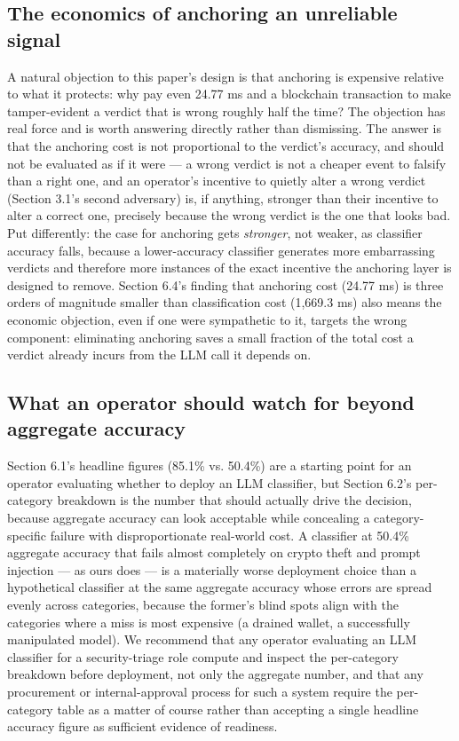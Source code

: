 \documentclass[journal,10pt,twocolumn]{IEEEtran}
\begin{document}
\subsection{The economics of anchoring an unreliable signal}

A natural objection to this paper's design is that anchoring is expensive relative to what it protects: why pay even 24.77 ms and a blockchain transaction to make tamper-evident a verdict that is wrong roughly half the time? The objection has real force and is worth answering directly rather than dismissing. The answer is that the anchoring cost is not proportional to the verdict's accuracy, and should not be evaluated as if it were --- a wrong verdict is not a cheaper event to falsify than a right one, and an operator's incentive to quietly alter a wrong verdict (Section 3.1's second adversary) is, if anything, stronger than their incentive to alter a correct one, precisely because the wrong verdict is the one that looks bad. Put differently: the case for anchoring gets \emph{stronger}, not weaker, as classifier accuracy falls, because a lower-accuracy classifier generates more embarrassing verdicts and therefore more instances of the exact incentive the anchoring layer is designed to remove. Section 6.4's finding that anchoring cost (24.77 ms) is three orders of magnitude smaller than classification cost (1,669.3 ms) also means the economic objection, even if one were sympathetic to it, targets the wrong component: eliminating anchoring saves a small fraction of the total cost a verdict already incurs from the LLM call it depends on.

\subsection{What an operator should watch for beyond aggregate accuracy}

Section 6.1's headline figures (85.1\% vs. 50.4\%) are a starting point for an operator evaluating whether to deploy an LLM classifier, but Section 6.2's per-category breakdown is the number that should actually drive the decision, because aggregate accuracy can look acceptable while concealing a category-specific failure with disproportionate real-world cost. A classifier at 50.4\% aggregate accuracy that fails almost completely on crypto theft and prompt injection --- as ours does --- is a materially worse deployment choice than a hypothetical classifier at the same aggregate accuracy whose errors are spread evenly across categories, because the former's blind spots align with the categories where a miss is most expensive (a drained wallet, a successfully manipulated model). We recommend that any operator evaluating an LLM classifier for a security-triage role compute and inspect the per-category breakdown before deployment, not only the aggregate number, and that any procurement or internal-approval process for such a system require the per-category table as a matter of course rather than accepting a single headline accuracy figure as sufficient evidence of readiness.
\end{document}
